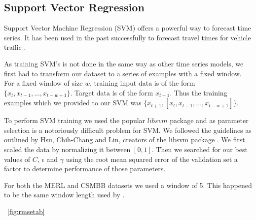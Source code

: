 \subsection{Support Vector Regression}
Support Vector Machine Regression (SVM) offers a powerful way to forecast time series.  It has been used in the past successfully to forecast travel times for vehicle traffic \cite{Wu2004}.  

As training SVM's is not done in the same way as other time series models, we first had to transform our dataset to a series of examples with a fixed window.  For a fixed window of size $w$, training input data is of the form $\{x_{t}, x_{t - 1}, ..., x_{t - w + 1}\}$.  Target data is of the form $x_{t + 1}$.  Thus the training examples which we provided to our SVM was $\{x_{t + 1}, [x_{t}, x_{t - 1}, ..., x_{t - w + 1}]\}$.

To perform SVM training we used the popular $libsvm$ package and as parameter selection is a notoriously difficult problem for SVM.  We followed the guidelines as outlined by Hsu, Chih-Chang and Lin, creators of the libsvm package \cite{Hsu2003}.  We first scaled the data by normalizing it between $[0, 1]$.  Then we searched for our best values of $C$, $\epsilon$ and $\gamma$ using the root mean squared error of the validation set a factor to determine performance of those parameters. 

For both the MERL and CSMBB datasets we used a window of 5.  This happened to be the same window length used by \cite{Wu2004}.

~\ref{fig:rmsetab}
